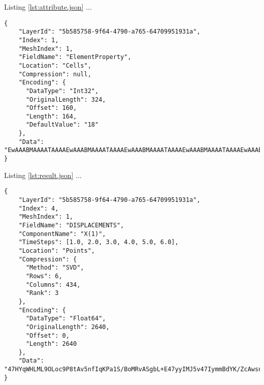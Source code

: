 Listing \ref{lst:attribute.json} ...

\begin{lstlisting}[style=json,caption=Example of attribute.json document,label=lst:attribute.json]
{
    "LayerId": "5b585758-9f64-4790-a765-64709951931a",
    "Index": 1,
    "MeshIndex": 1,
    "FieldName": "ElementProperty",
    "Location": "Cells",
    "Compression": null,
    "Encoding": {
      "DataType": "Int32",
      "OriginalLength": 324,
      "Offset": 160,
      "Length": 164,
      "DefaultValue": "18"
    },
    "Data": "EwAAABMAAAATAAAAEwAAABMAAAATAAAAEwAAABMAAAATAAAAEwAAABMAAAATAAAAEwAAABMAAAATAAAAEwAAAB..."
}
\end{lstlisting}

Listing \ref{lst:result.json} ...

\begin{lstlisting}[style=json,caption=Example of result.json document,label=lst:result.json]
{
    "LayerId": "5b585758-9f64-4790-a765-64709951931a",
    "Index": 4,
    "MeshIndex": 1,
    "FieldName": "DISPLACEMENTS",
    "ComponentName": "X(1)",
    "TimeSteps": [1.0, 2.0, 3.0, 4.0, 5.0, 6.0],
    "Location": "Points",
    "Compression": {
      "Method": "SVD",
      "Rows": 6,
      "Columns": 434,
      "Rank": 3
    },
    "Encoding": {
      "DataType": "Float64",
      "OriginalLength": 2640,
      "Offset": 0,
      "Length": 2640
    },
    "Data": "47HYqWHLML9OLoc9P8tAv5nfIqKPa1S/BoMRvASgbL+E47yyIMJ5v47IymmBdYK/ZcAwsn55IL+uuEUHN3swv1..."
}
\end{lstlisting}